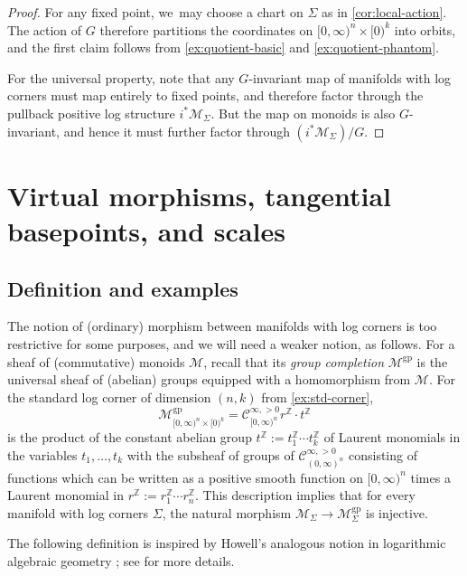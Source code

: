 \documentclass[10pt]{amsart}
\theoremstyle{definition}
\theoremstyle{remark}
\let\defn\emph
\newcommand{\ZZ}{\mathbb{Z}}
\newcommand{\model}[2]{\halfspc{#1}\times[0)^{#2}}
\newcommand{\halfspc}[1]{[0,\infty)^{#1}}
\newcommand{\cM}{\mathscr{M}}
\newcommand{\cMgp}{\mathscr{M}^{\mathrm{gp}}}
\newcommand{\Cinfpos}[1]{\mathscr{C}^{\infty, > 0}_{#1}}
\newcommand{\Sig}{\Sigma}
\begin{document}
\begin{proof}
For any fixed point, we~may choose a chart on $\Sig$ as in \autoref{cor:local-action}. The action of $G$ therefore partitions the coordinates on $\model{n}{k}$ into orbits, and the first claim follows from \autoref{ex:quotient-basic} and \autoref{ex:quotient-phantom}.

For the universal property, note that any $G$\nobreakdash-invariant map of manifolds with log corners must map entirely to fixed points, and therefore factor through the pullback positive log structure $i^*\cM_\Sig$. But the map on monoids is also $G$\nobreakdash-invariant, and hence it must further factor through $(i^*\cM_\Sig)/G$.
\end{proof}

\section{Virtual morphisms, tangential basepoints, and scales}\label{sec:weak-morphisms}

\subsection{Definition and examples}

The notion of (ordinary) morphism between manifolds with log corners is too restrictive for some purposes, and we will need a weaker notion, as follows. For a sheaf of (commutative) monoids $\cM$, recall that its \defn{group completion} $\cMgp$ is the universal sheaf of (abelian) groups equipped with a homomorphism from $\cM$. For the standard log corner of dimension $(n,k)$ from \autoref{ex:std-corner},
\[
\cMgp_{\model{n}{k}} = \Cinfpos{\halfspc{n}}r^{\ZZ}\cdot t^{\ZZ}
\]
is the product of the constant abelian group $t^{\ZZ}:=t_1^{\ZZ}\cdots t_k^{\ZZ}$ of Laurent monomials in the variables $t_1,\ldots,t_k$ with the subsheaf of groups of $\Cinfpos{(0,\infty)^n}$ consisting of functions which can be written as a positive smooth function on $\halfspc{n}$ times a Laurent monomial in $r^{\ZZ}:=r_1^{\ZZ}\cdots r_n^{\ZZ}$. This description implies that for every manifold with log corners $\Sig$, the natural morphism $\cM_\Sig\to \cMgp_\Sig$ is injective.

The following definition is inspired by Howell's analogous notion in logarithmic algebraic geometry \cite{Howell2017}; see \cite{DPP:WeakMorphisms} for more details.
\end{document}
